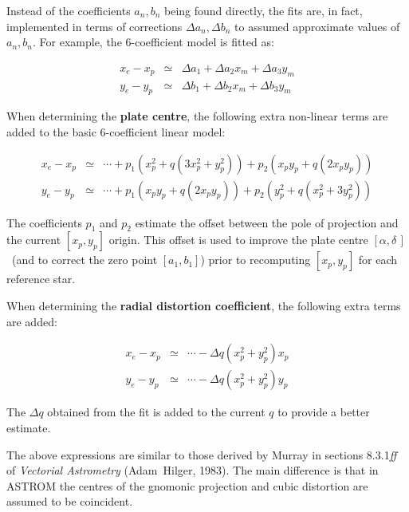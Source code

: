 \documentclass[twoside,11pt]{article}
\renewcommand{\_}{\texttt{\symbol{95}}}
\newcommand{\radec}     {$[\alpha,\delta\,]$}
\begin{document}
Instead of the coefficients $a_{n},b_{n}$ being found directly, the fits
are, in fact, implemented in terms of corrections $\Delta a_{n},\Delta
b_{n}$ to assumed approximate values of $a_{n},b_{n}$.  For example,
the 6-coefficient model is fitted as:

\begin{eqnarray*}
x_{e} - x_{p} & \simeq & \Delta a_{1}
          + \Delta a_{2} x_{m} + \Delta a_{3} y_{m} \\
y_{e} - y_{p} &\simeq & \Delta b_{1}
          + \Delta b_{2} x_{m} + \Delta b_{3} y_{m}
\end{eqnarray*}

When determining the \textbf{plate centre}, the following extra non-linear
terms are added to the basic 6-coefficient linear model:

\begin{eqnarray*}
x_{e} - x_{p} & \simeq & \cdots + p_{1} (x_{p}^{2} + q (3 x_{p}^{2} + y_{p}^{2}))
                    + p_{2} (x_{p}y_{p} + q (2 x_{p}y_{p})) \\
y_{e} - y_{p} & \simeq & \cdots + p_{1} (x_{p}y_{p} + q (2 x_{p}y_{p}))
                    + p_{2} (y_{p}^{2} + q (x_{p}^{2} + 3 y_{p}^{2}))
\end{eqnarray*}

The coefficients $p_{1}$ and $p_{2}$ estimate the offset between the
pole of projection and the current $[x_{p},y_{p}]$ origin.  This offset
is used to improve the plate centre \radec\ (and to correct the zero
point $[a_{1},b_{1}]$) prior to recomputing $[x_{p},y_{p}]$ for each
reference star.

When determining the \textbf{radial distortion coefficient}, the
following extra terms are added:

\begin{eqnarray*}
x_{e} - x_{p} & \simeq & \cdots - \Delta q (x_{p}^{2} + y_{p}^{2}) x_{p} \\
y_{e} - y_{p} & \simeq & \cdots - \Delta q (x_{p}^{2} + y_{p}^{2}) y_{p}
\end{eqnarray*}

The $\Delta q$ obtained from the fit is added to the current $q$ to
provide a better estimate.

The above expressions are similar to those derived by Murray in sections
8.3.1\textit{ff} of \textit{Vectorial Astrometry} (Adam~Hilger,
1983).  The main difference is that in ASTROM the centres of the gnomonic
projection and cubic distortion are assumed to be coincident.
\end{document}
